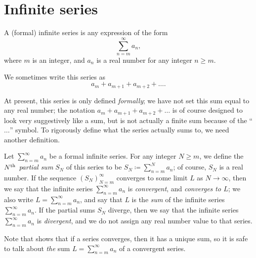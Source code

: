 \section{Infinite series}\label{i:sec:7.2}

\begin{defn}\label{i:7.2.1}
  A (formal) infinite series is any expression of the form
  \[
    \sum_{n = m}^\infty a_n,
  \]
  where \(m\) is an integer, and \(a_n\) is a real number for any integer \(n \geq m\).
\end{defn}

\begin{note}
  We sometimes write this series as
  \[
    a_m + a_{m + 1} + a_{m + 2} + \dots.
  \]
\end{note}

\begin{note}
  At present, this series is only defined \emph{formally};
  we have not set this sum equal to any real number;
  the notation \(a_m + a_{m + 1} + a_{m + 2} + \dots\) is of course designed to look very suggestively like a sum, but is not actually a finite sum because of the ``\(\dots\)'' symbol.
  To rigorously define what the series actually sums to, we need another definition.
\end{note}

\begin{defn}\label{i:7.2.2}
  Let \(\sum_{n = m}^\infty a_n\) be a formal infinite series.
  For any integer \(N \geq m\), we define the \emph{\(N^{\operatorname{th}}\) partial sum} \(S_N\) of this series to be \(S_N \coloneqq \sum_{n = m}^N a_n\);
  of course, \(S_N\) is a real number.
  If the sequence \((S_N)_{N = m}^\infty\) converges to some limit \(L\) as \(N \to \infty\), then we say that the infinite series \(\sum_{n = m}^\infty a_n\) is \emph{convergent}, and \emph{converges to \(L\)};
  we also write \(L = \sum_{n = m}^\infty a_n\), and say that \(L\) is the \emph{sum} of the infinite series \(\sum_{n = m}^\infty a_n\).
  If the partial sums \(S_N\) diverge, then we say that the infinite series \(\sum_{n = m}^\infty a_n\) is \emph{divergent}, and we do not assign any real number value to that series.
\end{defn}

\begin{rmk}\label{i:7.2.3}
  Note that  shows that if a series converges, then it has a unique sum, so it is safe to talk about \emph{the} sum \(L = \sum_{n = m}^\infty a_n\) of a convergent series.
\end{rmk}

